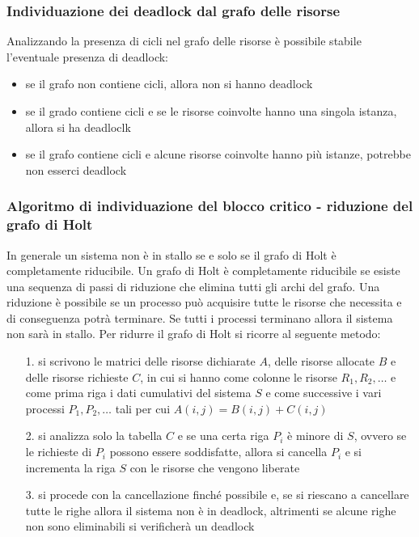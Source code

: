 \documentclass[a4paper]{article}
\begin{document}
\subsubsection*{Individuazione dei deadlock dal grafo delle risorse}
Analizzando la presenza di cicli nel grafo delle risorse è possibile stabile l'eventuale presenza di deadlock:
\begin{itemize}
	\item se il grafo non contiene cicli, allora non si hanno deadlock
	\item se il grado contiene cicli e se le risorse coinvolte hanno una singola istanza, allora si ha deadloclk
	\item se il grafo contiene cicli e alcune risorse coinvolte hanno più istanze, potrebbe non esserci deadlock
\end{itemize}

\subsubsection*{Algoritmo di individuazione del blocco critico - riduzione del grafo di Holt}
In generale un sistema non è in stallo se e solo se il grafo di Holt è completamente riducibile. Un grafo di Holt è completamente
riducibile se esiste una sequenza di passi di riduzione che elimina tutti gli archi del grafo. Una riduzione è possibile se un
processo può acquisire tutte le risorse che necessita e di conseguenza potrà terminare. Se tutti i processi terminano allora il
sistema non sarà in stallo. Per ridurre il grafo di Holt si ricorre al seguente metodo:
\begin{itemize}
	\item[1.] si scrivono le matrici delle risorse dichiarate \(A\), delle risorse allocate \(B\) e delle risorse richieste \(C\),
	in cui si hanno come colonne le risorse \(R_1, R_2, \dots\) e come prima riga i dati cumulativi del sistema \(S\) e come
	successive i vari processi \(P_1, P_2, \dots\) tali per cui \(A(i,j) = B(i,j) + C(i,j)\)
	\item[2.] si analizza solo la tabella \(C\) e se una certa riga \(P_i\) è minore di \(S\), ovvero se le richieste di \(P_i\)
	possono essere soddisfatte, allora si cancella \(P_i\) e si incrementa la riga \(S\) con le risorse che vengono liberate
	\item[3.] si procede con la cancellazione finché possibile e, se si riescano a cancellare tutte le righe allora il sistema
	non è in deadlock, altrimenti se alcune righe non sono eliminabili si verificherà un deadlock
\end{itemize}
\end{document}
